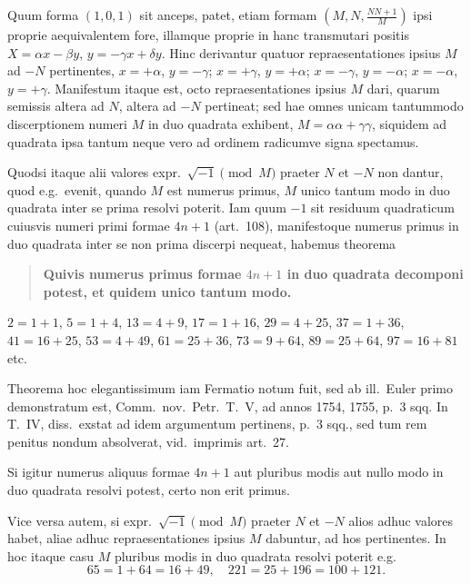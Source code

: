\documentclass[12pt,a4paper]{article}
\theoremstyle{plain}
\begin{document}
Quum forma $(1,0,1)$ sit anceps, patet, etiam formam $(M,N,\frac{NN+1}{M})$ ipsi proprie aequivalentem fore, illamque proprie in hanc transmutari positis $X = \alpha x - \beta y$, $y = -\gamma x + \delta y$. Hinc derivantur quatuor repraesentationes ipsius $M$ ad $-N$ pertinentes, $x = +\alpha$, $y = -\gamma$; $x = +\gamma$, $y = +\alpha$; $x = -\gamma$, $y = -\alpha$; $x = -\alpha$, $y = +\gamma$. Manifestum itaque est, octo repraesentationes ipsius $M$ dari, quarum semissis altera ad $N$, altera ad $-N$ pertineat; sed hae omnes unicam tantummodo discerptionem numeri $M$ in duo quadrata exhibent, $M = \alpha\alpha + \gamma\gamma$, siquidem ad quadrata ipsa tantum neque vero ad ordinem radicumve signa spectamus.

Quodsi itaque alii valores expr.~$\sqrt{-1} \pmod{M}$ praeter $N$ et $-N$ non dantur, quod e.g.~evenit, quando $M$ est numerus primus, $M$ unico tantum modo in duo quadrata inter se prima resolvi poterit. Iam quum $-1$ sit residuum quadraticum cuiusvis numeri primi formae $4n+1$ (art.~108), manifestoque numerus primus in duo quadrata inter se non prima discerpi nequeat, habemus theorema

\begin{quote}
\textbf{Quivis numerus primus formae $4n+1$ in duo quadrata decomponi potest, et quidem unico tantum modo.}
\end{quote}

$2 = 1+1$, $5 = 1+4$, $13 = 4+9$, $17 = 1+16$, $29 = 4+25$, $37 = 1+36$, $41 = 16+25$, $53 = 4+49$, $61 = 25+36$, $73 = 9+64$, $89 = 25+64$, $97 = 16+81$ etc.

Theorema hoc elegantissimum iam Fermatio notum fuit, sed ab ill.~Euler primo demonstratum est, Comm.~nov.~Petr.~T.~V, ad annos 1754, 1755, p.~3 sqq. In T.~IV, diss.~exstat ad idem argumentum pertinens, p.~3 sqq., sed tum rem penitus nondum absolverat, vid.~imprimis art.~27.

Si igitur numerus aliquus formae $4n+1$ aut pluribus modis aut nullo modo in duo quadrata resolvi potest, certo non erit primus.

Vice versa autem, si expr.~$\sqrt{-1} \pmod{M}$ praeter $N$ et $-N$ alios adhuc valores habet, aliae adhuc repraesentationes ipsius $M$ dabuntur, ad hos pertinentes. In hoc itaque casu $M$ pluribus modis in duo quadrata resolvi poterit e.g.
\[
65 = 1 + 64 = 16 + 49, \quad 221 = 25 + 196 = 100 + 121.
\]
\end{document}
